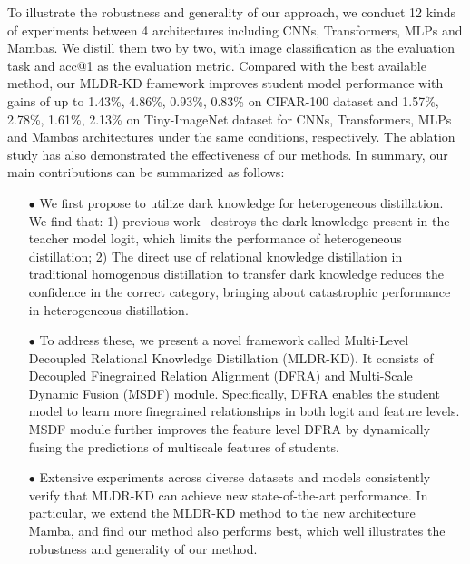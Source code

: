 To illustrate the robustness and generality of our approach, we conduct 12 kinds of experiments between 4 architectures including CNNs, Transformers, MLPs and Mambas. We distill them two by two, with image classification as the evaluation task and acc@1 as the evaluation metric. Compared with the best available method, our MLDR-KD framework improves student model performance with gains of up to 1.43\%, 4.86\%, 0.93\%, 0.83\% on CIFAR-100 dataset and 1.57\%, 2.78\%, 1.61\%, 2.13\% on Tiny-ImageNet dataset for CNNs, Transformers, MLPs and Mambas architectures under the same conditions, respectively. The ablation study has also demonstrated the effectiveness of our methods.
In summary, our main contributions can be summarized as follows:
\begin{enumerate}
    \item[$\bullet$] We first propose to utilize dark knowledge for heterogeneous distillation. We find that: 1) previous work~\cite{hao2024one} destroys the dark knowledge present in the teacher model logit, which limits the performance of heterogeneous distillation; 2) The direct use of relational knowledge distillation in traditional homogenous distillation 
    to transfer dark knowledge 
    reduces the confidence in the correct category, bringing about catastrophic performance in heterogeneous distillation. 

    \item[$\bullet$] To address these, we present a novel framework called Multi-Level Decoupled Relational Knowledge Distillation (MLDR-KD).
    It consists of Decoupled Finegrained Relation Alignment (DFRA) and Multi-Scale Dynamic Fusion (MSDF) module. Specifically, DFRA enables the student model to learn more finegrained relationships in both logit and feature levels. MSDF module further improves the feature level DFRA by dynamically fusing the predictions of multiscale features of students.

    \item[$\bullet$] Extensive experiments across diverse datasets and models consistently verify that MLDR-KD can achieve new state-of-the-art performance. In particular, we extend the MLDR-KD method to the new architecture Mamba, and find our method also performs best, which well illustrates the robustness and generality of our method.
\end{enumerate}

